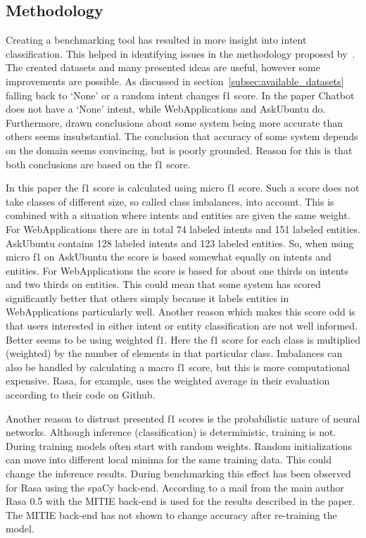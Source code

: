\subsection{Methodology}
\label{subsec:methodology}
Creating a benchmarking tool has resulted in more insight into intent classification.
This helped in identifying issues in the methodology proposed by~\citet{braun2017}.
The created datasets and many presented ideas are useful, however some improvements are possible.
As discussed in section~\ref{subsec:available_datasets} falling back to `None' or a random intent changes f1 score.
In the paper Chatbot does not have a `None' intent, while WebApplications and AskUbuntu do.
Furthermore, drawn conclusions about some system being more accurate than others seems insubstantial.
The conclusion that accuracy of some system depends on the domain seems convincing, but is poorly grounded.
Reason for this is that both conclusions are based on the f1 score.

In this paper the f1 score is calculated using micro f1 score.
Such a score does not take classes of different size, so called class imbalances, into account.
This is combined with a situation where intents and entities are given the same weight.
For WebApplications there are in total 74 labeled intents and 151 labeled entities.
AskUbuntu contains 128 labeled intents and 123 labeled entities.
So, when using micro f1 on AskUbuntu the score is based somewhat equally on intents and entities.
For WebApplications the score is based for about one thirds on intents and two thirds on entities.
This could mean that some system has scored significantly better that others simply because it labels entities in WebApplications particularly well.
Another reason which makes this score odd is that users interested in either intent or entity classification are not well informed.
Better seems to be using weighted f1.
Here the f1 score for each class is multiplied (weighted) by the number of elements in that particular class.
Imbalances can also be handled by calculating a macro f1 score, but this is more computational expensive.
Rasa, for example, uses the weighted average in their evaluation according to their code on Github.

Another reason to distrust presented f1 scores is the probabilistic nature of neural networks.
Although inference (classification) is deterministic, training is not.
During training models often start with random weights.
Random initializations can move into different local minima for the same training data.
This could change the inference results.
During benchmarking this effect has been observed for Rasa using the spaCy back-end.
According to a mail from the main author Rasa 0.5 with the MITIE back-end is used for the results described in the paper.
The MITIE back-end has not shown to change accuracy after re-training the model.


